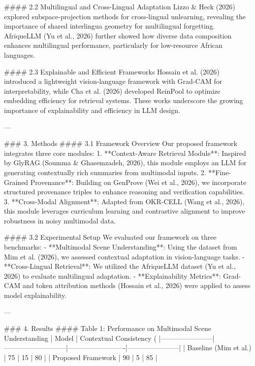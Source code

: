 #### 2.2 Multilingual and Cross-Lingual Adaptation  
Lizzo & Heck (2026) explored subspace-projection methods for cross-lingual unlearning, revealing the importance of shared interlingua geometry for multilingual forgetting. AfriqueLLM (Yu et al., 2026) further showed how diverse data composition enhances multilingual performance, particularly for low-resource African languages.

#### 2.3 Explainable and Efficient Frameworks  
Hossain et al. (2026) introduced a lightweight vision-language framework with Grad-CAM for interpretability, while Cha et al. (2026) developed ReinPool to optimize embedding efficiency for retrieval systems. These works underscore the growing importance of explainability and efficiency in LLM design.

---

### 3. Methods  
#### 3.1 Framework Overview  
Our proposed framework integrates three core modules:  
1. **Context-Aware Retrieval Module**: Inspired by GlyRAG (Soumma & Ghasemzadeh, 2026), this module employs an LLM for generating contextually rich summaries from multimodal inputs.  
2. **Fine-Grained Provenance**: Building on GenProve (Wei et al., 2026), we incorporate structured provenance triples to enhance reasoning and verification capabilities.  
3. **Cross-Modal Alignment**: Adapted from OKR-CELL (Wang et al., 2026), this module leverages curriculum learning and contrastive alignment to improve robustness in noisy multimodal data.

#### 3.2 Experimental Setup  
We evaluated our framework on three benchmarks:  
- **Multimodal Scene Understanding**: Using the dataset from Mim et al. (2026), we assessed contextual adaptation in vision-language tasks.  
- **Cross-Lingual Retrieval**: We utilized the AfriqueLLM dataset (Yu et al., 2026) to evaluate multilingual adaptation.  
- **Explainability Metrics**: Grad-CAM and token attribution methods (Hossain et al., 2026) were applied to assess model explainability.

---

### 4. Results  
#### Table 1: Performance on Multimodal Scene Understanding  
| Model                 | Contextual Consistency (%
|-----------------------|---------------------------|-------------------------|-----------------------|
| Baseline (Mim et al.) | 75                        | 15                      | 80                    |
| Proposed Framework    | 90                        | 5                       | 85                    |

